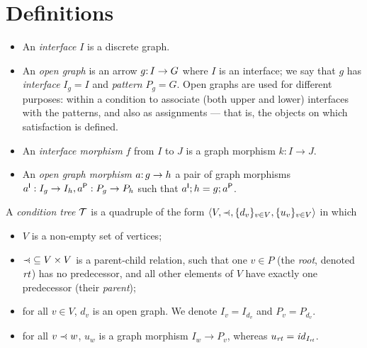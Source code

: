 \section{Definitions}
\label{sec:definitions}

\begin{itemize}
\item An \emph{interface} $I$ is a discrete graph.

\item An \emph{open graph} is an arrow $g{:}\, I\rightarrow G$ where $I$ is an interface; we say that $g$ has \emph{interface} $I_g=I$ and \emph{pattern} $P_g=G$. Open graphs are used for different purposes: within a condition to associate (both upper and lower) interfaces with the patterns, and also as assignments --- that is, the objects on which satisfaction is defined.

\item An \emph{interface morphism} $f$ from $I$ to $J$ is a graph morphism $k:I\to J$.

\item An \emph{open graph morphism} $a{:}\, g\rightarrow h$ a pair of graph morphisms $a^{\mathsf I}:I_g\rightarrow I_h, a^{\mathsf P}:P_g\rightarrow P_h$ such that $a^{\mathsf I};h=g;a^{\mathsf P}$.
\end{itemize}
%
\begin{definition}\label{def:condition tree}
A \emph{condition tree} ${\mathcal{T}}$ is a quadruple of the form $\tupof{V, {\parentof}, \setof{d_v}_{v\in V}, \setof{u_v}_{v\in V}}$ in which

\begin{itemize}[topsep=\itemsep]
\item $V$ is a non-empty set of vertices;

\item ${\parentof}\subseteq V\times V$ is a parent-child relation, such that one $v\in P$ (the \emph{root}, denoted $\mathit{rt}$) has no predecessor, and all other elements of $V$ have exactly one predecessor (their \emph{parent});

\item for all $v\in V$, $d_v$ is an open graph. We denote $I_v=I_{d_v}$ and $P_v=P_{d_v}$.

\item for all $v\parentof w$, $u_w$ is a graph morphism $I_w\to P_v$, whereas $u_{\mathit{rt}}={\mathit{id}}_{I_{\mathit{rt}}}$.
\end{itemize}
\end{definition}
%
